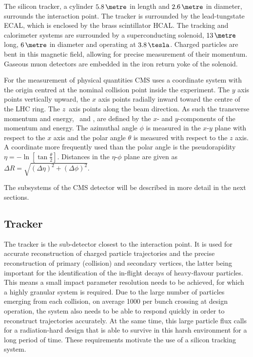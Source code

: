 The silicon tracker, a cylinder $5.8\,\metre$ in length and $2.6\,\metre$ in
diameter, surrounds the interaction point. The tracker is 
surrounded by the lead-tungstate \ac{ECAL}, which is enclosed
by the brass scintillator \ac{HCAL}.
The tracking and calorimeter systems are surrounded by a superconducting
solenoid, $13\,\metre$ long, $6\,\metre$ in diameter and operating at $3.8\,\tesla$.
Charged particles are bent in this magnetic field, allowing for precise 
measurement of their momentum. Gaseous muon detectors are embedded in the 
iron return yoke of the solenoid.

For the measurement of physical quantities \ac{CMS} uses a coordinate
system with the origin centred at the nominal collision point
inside the experiment. The $y$ axis points vertically upward, the $x$ axis
points radially inward toward the centre of the \ac{LHC} ring. The \mbox{$z$ axis}
points along the beam direction. As such the transverse momentum and energy, 
\pT~and \ET, are defined by the $x$- and $y$-components of the momentum and energy.
The azimuthal angle $\phi$ is measured in the $x$-$y$ plane with respect to the $x$ axis  
and the polar angle $\theta$ is measured with respect to the $z$ axis. A coordinate
more frequently used than the polar angle is the pseudorapidity $\eta = -\ln{[\tan{\frac{\theta}{2}}]}$. %
Distances in the $\eta$-$\phi$ plane are given as $\Delta R = \sqrt{(\Delta\eta)^2+(\Delta\phi)^2}$. 

The subsystems of the \ac{CMS} detector will be described in more detail in the 
next sections.

\subsection{Tracker}
\label{sec:CMSLHC_CMS_tracker}
The tracker \cite{cms-jinst} is the sub-detector closest to the interaction point. It
is used for accurate reconstruction of charged particle trajectories and 
the precise reconstruction of primary (collision) and secondary vertices, the latter being important for
the identification of the in-flight decays of heavy-flavour particles. This means a small impact parameter
resolution needs to be achieved, for which a highly granular system is required. 
Due to the large number of particles emerging from 
each collision, on average 1000 per bunch crossing at design operation, the 
system also needs to be able to respond quickly in order to reconstruct trajectories accurately.
At the same time, this large particle flux calls for a 
radiation-hard design that is able to survive in this harsh environment
for a long period of time. These requirements motivate the use of a silicon tracking
system. 

